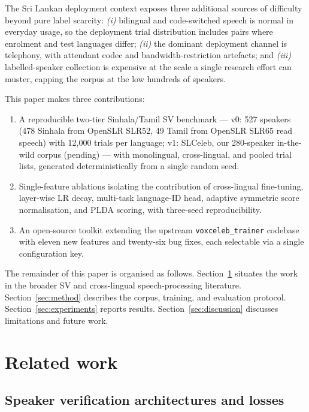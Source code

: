 \documentclass[11pt,a4paper]{article}
\begin{document}
The Sri Lankan deployment context exposes three additional sources of
difficulty beyond pure label scarcity: \emph{(i)} bilingual and
code-switched speech is normal in everyday usage, so the deployment
trial distribution includes pairs where enrolment and test languages
differ; \emph{(ii)} the dominant deployment channel is telephony, with
attendant codec and bandwidth-restriction artefacts; and \emph{(iii)}
labelled-speaker collection is expensive at the scale a single
research effort can muster, capping the corpus at the low hundreds of
speakers.

This paper makes three contributions:

\begin{enumerate}
    \item A reproducible two-tier Sinhala/Tamil SV benchmark ---
    v0: 527 speakers (478 Sinhala from OpenSLR SLR52, 49 Tamil from
    OpenSLR SLR65 read speech) with 12{,}000 trials per language;
    v1: SLCeleb, our 280-speaker in-the-wild corpus (pending) --- with
    monolingual, cross-lingual, and pooled trial lists, generated
    deterministically from a single random seed.
    \item Single-feature ablations isolating the contribution of
    cross-lingual fine-tuning, layer-wise LR decay, multi-task
    language-ID head, adaptive symmetric score normalisation, and
    PLDA scoring, with three-seed reproducibility.
    \item An open-source toolkit \cite{slspv2026repo} extending
    the upstream \texttt{voxceleb\_trainer} codebase with eleven new
    features and twenty-six bug fixes, each selectable via a single
    configuration key.
\end{enumerate}

The remainder of this paper is organised as follows.
Section~\ref{sec:related} situates the work in the broader SV and
cross-lingual speech-processing literature.
Section~\ref{sec:method} describes the corpus, training, and
evaluation protocol.
Section~\ref{sec:experiments} reports results.
Section~\ref{sec:discussion} discusses limitations and future work.

\section{Related work}
\label{sec:related}

\subsection{Speaker verification architectures and losses}
\end{document}
